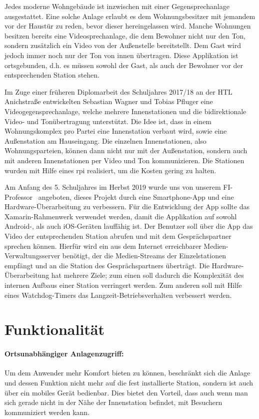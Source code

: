 Jedes moderne Wohngebäude ist inzwischen mit einer Gegensprechanlage ausgestattet.
Eine solche Anlage erlaubt es dem Wohnungsbesitzer mit jemandem vor der Haustür zu reden, bevor dieser hereingelassen wird.
Manche Wohnungen besitzen bereits eine Videosprechanlage, die dem Bewohner nicht nur den Ton, sondern zusätzlich ein Video von der Außenstelle bereitstellt.
Dem Gast wird jedoch immer noch nur der Ton von innen übertragen.
Diese Applikation ist ortsgebunden, d.h. es müssen sowohl der Gast, als auch der Bewohner vor der entsprechenden Station stehen.\par

Im Zuge einer früheren Diplomarbeit des Schuljahres 2017/18 an der HTL Anichstraße entwickelten Sebastian Wagner und Tobias Pfluger eine Videogegensprechanlage, welche mehrere Innenstationen und die bidirektionale Video- und Tonübertragung unterstützt.
Die Idee ist, dass in einem Wohnungskomplex pro Partei eine Innenstation verbaut wird, sowie eine Außenstation am Hauseingang.
Die einzelnen Innenstationen, also Wohnungsparteien, können dann nicht nur mit der Außenstation, sondern auch mit anderen Innenstationen per Video und Ton kommunizieren.
Die Stationen wurden mit Hilfe eines \ac{rpi} realisiert, um die Kosten gering zu halten.\par

Am Anfang des 5. Schuljahres im Herbst 2019 wurde uns von unserem FI-Professor \MarioPrantl\ angeboten, dieses Projekt durch eine Smartphone-App und eine Hardware-Überarbeitung zu verbessern.
Für die Entwicklung der App sollte das Xamarin-Rahmenwerk verwendet werden, damit die Applikation auf sowohl Android-, als auch iOS-Geräten lauffähig ist. 
Der Benutzer soll über die App das Video der entsprechenden Station abrufen und mit dem Gesprächspartner sprechen können.
Hierfür wird ein aus dem Internet erreichbarer Medien-Verwaltungsserver benötigt, der die Medien-Streams der Einzelstationen empfängt und an die Station des Gesprächspartners überträgt.
Die Hardware-Überarbeitung hat mehrere Ziele; zum einen soll dadurch die Komplexität des internen Aufbaus einer Station verringert werden.
Zum anderen soll mit Hilfe eines Watchdog-Timers das Langzeit-Betriebsverhalten verbessert werden.

\section{Funktionalität}
\paragraph{Ortsunabhängiger Anlagenzugriff:}
Um dem Anwender mehr Komfort bieten zu können, beschränkt sich die Anlage und dessen Funktion nicht mehr auf die fest installierte Station, sondern ist auch über ein mobiles Gerät bedienbar.
Dies bietet den Vorteil, dass auch wenn man sich gerade nicht in der Nähe der Innenstation befindet, mit Besuchern kommuniziert werden kann.

